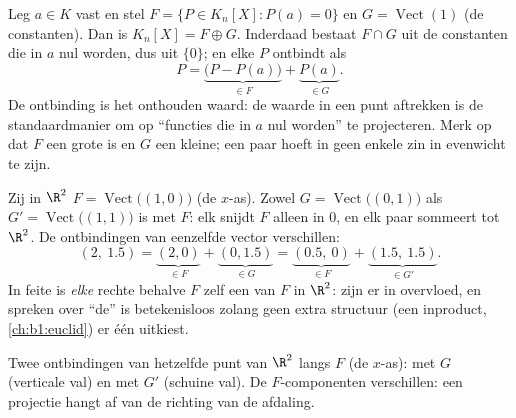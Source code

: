 \begin{example}
\label{ex:b1:vspaces:hyperplane}
Leg $a \in K$ vast en stel $F = \{P \in K_n[X] : P(a) = 0\}$ en
$G = \operatorname{Vect}(1)$ (de constanten). Dan is $K_n[X] = F
\oplus G$. Inderdaad bestaat $F \cap G$ uit de constanten die in
$a$ nul worden, dus uit $\{0\}$; en elke $P$ ontbindt als
\[
P = \underbrace{\bigl(P - P(a)\bigr)}_{\in F}
+ \underbrace{P(a)}_{\in G} .
\]
De ontbinding is het onthouden waard: de waarde in een punt
aftrekken is de standaardmanier om op ``functies die in $a$ nul
worden'' te projecteren. Merk op dat $F$ een grote  is en
$G$ een kleine; een  paar hoeft in geen enkele zin in
evenwicht te zijn.
\end{example}

\begin{example}
\label{ex:b1:vspaces:manysupplements}
Zij in $\R^2$ $F = \operatorname{Vect}\bigl((1,0)\bigr)$ (de
$x$-as). Zowel $G = \operatorname{Vect}\bigl((0,1)\bigr)$ als $G'
= \operatorname{Vect}\bigl((1,1)\bigr)$ is  met $F$:
elk snijdt $F$ alleen in $0$, en elk paar sommeert tot $\R^2$. De
ontbindingen van eenzelfde vector verschillen:
\[
(2,\ 1.5) = \underbrace{(2, 0)}_{\in F} +
\underbrace{(0, 1.5)}_{\in G}
= \underbrace{(0.5,\ 0)}_{\in F} +
\underbrace{(1.5,\ 1.5)}_{\in G'} .
\]
In feite is \emph{elke} rechte behalve $F$ zelf een 
van $F$ in $\R^2$:  zijn er in overvloed, en
spreken over ``de''  is betekenisloos zolang geen
extra structuur (een inproduct, \cref{ch:b1:euclid}) er één
uitkiest.
\end{example}

\begin{omfigure}

{\small Twee ontbindingen van hetzelfde punt van $\R^2$ langs $F$
(de $x$-as): met  $G$ (verticale val) en met
 $G'$ (schuine val). De $F$-componenten verschillen:
een projectie hangt af van de richting van de afdaling.}
\end{omfigure}

